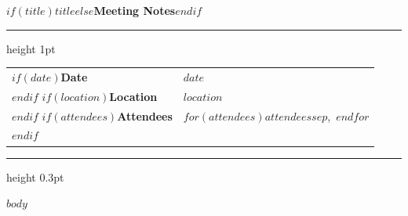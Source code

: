 \documentclass[11pt,letterpaper]{article}
\begin{document}
\thispagestyle{plain}

\noindent
{\LARGE\bfseries\color{headercolor} $if(title)$$title$$else$Meeting Notes$endif$}

\vspace{0.4em}
{\color{rulecolor}\hrule height 1pt}
\vspace{0.6em}

\noindent
\begin{tabularx}{\textwidth}{@{} l X @{}}
  $if(date)$\textbf{Date} & $date$ \\[0.3em]$endif$
  $if(location)$\textbf{Location} & $location$ \\[0.3em]$endif$
  $if(attendees)$\textbf{Attendees} & $for(attendees)$$attendees$$sep$,\ $endfor$ \\[0.3em]$endif$
\end{tabularx}

\vspace{0.5em}
{\color{rulecolor}\hrule height 0.3pt}
\vspace{0.8em}

$body$
\end{document}
